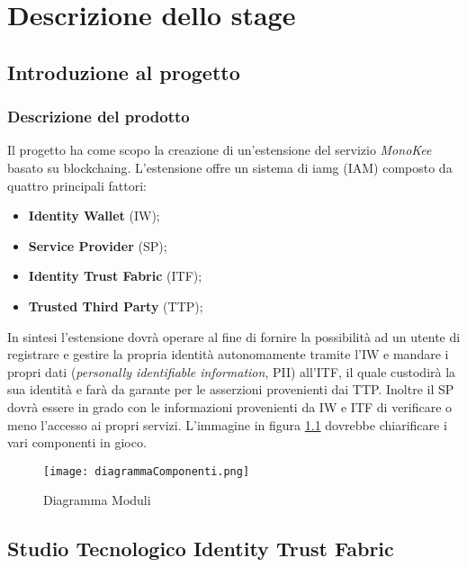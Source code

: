 
\chapter{Descrizione dello stage}
\label{cap:descrizione-stage}



\section{Introduzione al progetto}
\subsection{Descrizione del prodotto}
Il progetto ha come scopo la creazione di un’estensione del servizio \textit{MonoKee} basato su \gls{blockchaing}. L’estensione offre un sistema di \gls{iamg} (IAM) composto da quattro principali fattori:
    \begin{itemize}
        \item \textbf{Identity Wallet} (IW);
        \item \textbf{Service Provider} (SP);
        \item \textbf{Identity Trust Fabric} (ITF);
        \item \textbf{Trusted Third Party} (TTP);
    \end{itemize} 
In sintesi l’estensione dovrà operare al fine di fornire la possibilità ad un utente di registrare e gestire la propria identità autonomamente tramite l’IW e mandare i propri dati (\textit{personally identifiable information}, PII) all’ITF, il quale custodirà la sua identità e farà da garante per le asserzioni provenienti dai TTP. Inoltre il SP dovrà essere in grado con le informazioni provenienti da IW e ITF di verificare o meno l’accesso ai propri servizi.
L'immagine in figura \ref{fig:diag-mod} dovrebbe chiarificare i vari componenti in gioco.
\begin{figure}[!h]
    \centering
    \texttt{[image: diagrammaComponenti.png]} 
    \caption{Diagramma Moduli}
    \label{fig:diag-mod} 
\end{figure}
\section{Studio Tecnologico Identity Trust Fabric}

